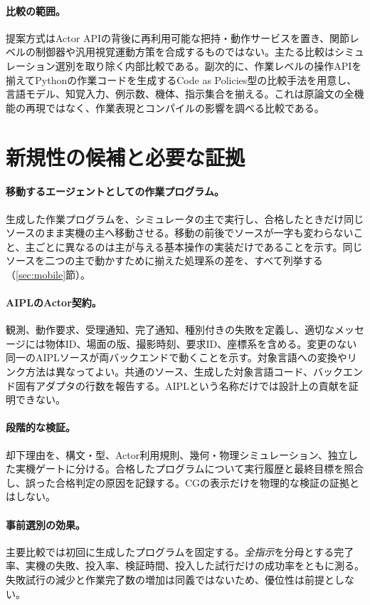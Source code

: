 \documentclass[10pt,letterpaper]{article}
\begin{document}
\paragraph{比較の範囲。}提案方式はActor APIの背後に再利用可能な把持・動作サービスを置き、関節レベルの制御器や汎用視覚運動方策を合成するものではない。主たる比較はシミュレーション選別を取り除く内部比較である。副次的に、作業レベルの操作APIを揃えてPythonの作業コードを生成するCode as Policies型の比較手法を用意し、言語モデル、知覚入力、例示数、機体、指示集合を揃える。これは原論文の全機能の再現ではなく、作業表現とコンパイルの影響を調べる比較である。

\section{新規性の候補と必要な証拠}\label{sec:claims}
\paragraph{移動するエージェントとしての作業プログラム。}生成した作業プログラムを、シミュレータの主で実行し、合格したときだけ同じソースのまま実機の主へ移動させる。移動の前後でソースが一字も変わらないこと、主ごとに異なるのは主が与える基本操作の実装だけであることを示す。同じソースを二つの主で動かすために揃えた処理系の差を、すべて列挙する（\ref{sec:mobile}節）。

\paragraph{AIPLのActor契約。}観測、動作要求、受理通知、完了通知、種別付きの失敗を定義し、適切なメッセージには物体ID、場面の版、撮影時刻、要求ID、座標系を含める。変更のない同一のAIPLソースが両バックエンドで動くことを示す。対象言語への変換やリンク方法は異なってよい。共通のソース、生成した対象言語コード、バックエンド固有アダプタの行数を報告する。AIPLという名称だけでは設計上の貢献を証明できない。

\paragraph{段階的な検証。}却下理由を、構文・型、Actor利用規則、幾何・物理シミュレーション、独立した実機ゲートに分ける。合格したプログラムについて実行履歴と最終目標を照合し、誤った合格判定の原因を記録する。CGの表示だけを物理的な検証の証拠とはしない。

\paragraph{事前選別の効果。}主要比較では初回に生成したプログラムを固定する。\emph{全指示}を分母とする完了率、実機の失敗、投入率、検証時間、投入した試行だけの成功率をともに測る。失敗試行の減少と作業完了数の増加は同義ではないため、優位性は前提としない。
\end{document}
